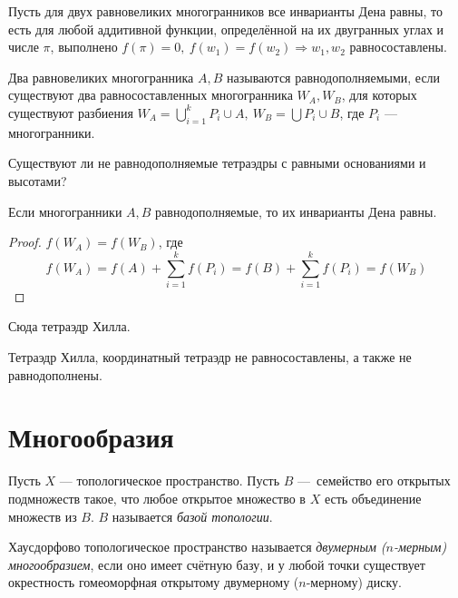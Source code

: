 \begin{theorem}[Сидлер]
    Пусть для двух равновеликих многогранников все инварианты Дена равны, то есть для любой аддитивной функции, определённой на их двугранных углах и числе $\pi$, выполнено $f(\pi) = 0, \ f(w_1) = f(w_2) \Rightarrow w_1, w_2$ равносоставлены.
\end{theorem}

\begin{definition}
    Два равновеликих многогранника $A, B$ называются равнодополняемыми, если существуют два равносоставленных многогранника $W_A, W_B$, для которых существуют разбиения $W_A = \bigcup_{i = 1}^k P_i \cup A, \ W_B = \bigcup P_i \cup B$, где $P_i$ — многогранники.
\end{definition}

\begin{theorem}
    Существуют ли не равнодополняемые тетраэдры с равными основаниями и высотами?
\end{theorem}

\begin{statement}
    Если многогранники $A,B$ равнодополняемые, то их инварианты Дена равны.
\end{statement}
\begin{proof}
    $f(W_A) = f(W_B)$, где $$f(W_A) = f(A) + \sum_{i = 1}^{k} f(P_i) = f(B) + \sum_{i = 1}^{k} f(P_i) = f(W_B)$$
\end{proof}

Сюда тетраэдр Хилла.

\begin{statement}
    Тетраэдр Хилла, координатный тетраэдр не равносоставлены, а также не равнодополнены.
\end{statement}

\newpage
\section{Многообразия}

\begin{definition}
    Пусть $X$ — топологическое пространство. Пусть $B$ — семейство его открытых подмножеств такое, что любое открытое множество в $X$ есть объединение множеств из $B$. $B$ называется \textit{базой топологии}.
\end{definition}

\begin{definition}
    Хаусдорфово топологическое пространство называется \textit{двумерным ($n$-мерным) многообразием}, если оно имеет счётную базу, и у любой точки существует окрестность гомеоморфная открытому двумерному ($n$-мерному) диску.
\end{definition}

